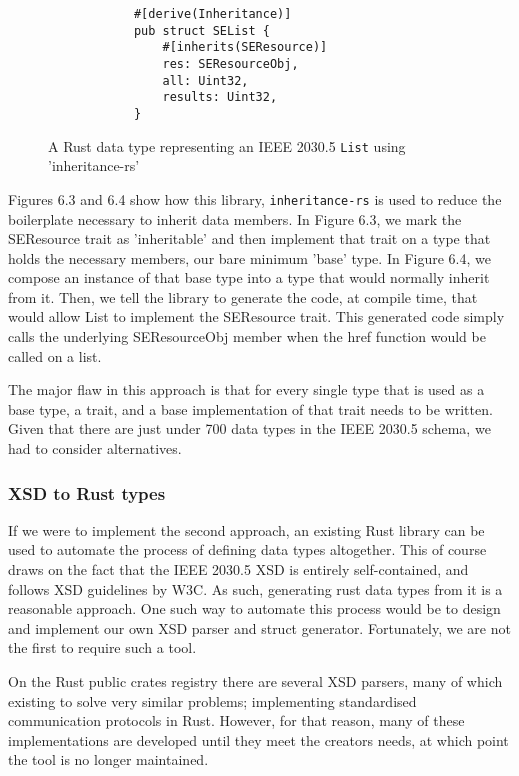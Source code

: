 \begin{figure}[H]
    \begin{center}
        \begin{lstlisting}
            #[derive(Inheritance)]
            pub struct SEList {
                #[inherits(SEResource)]
                res: SEResourceObj,
                all: Uint32,
                results: Uint32,
            }
        \end{lstlisting}
        \label{fig:listinher}
        \caption{A Rust data type representing an IEEE 2030.5 \texttt{List} using 'inheritance-rs'}
    \end{center}
\end{figure}


Figures 6.3 and 6.4 show how this library, \texttt{inheritance-rs} \cite[]{inheritancers} is used to reduce the boilerplate necessary to inherit data members. 
In Figure 6.3, we mark the SEResource trait as 'inheritable' and then implement that trait on a type that holds the necessary members, our bare minimum 'base' type. 
In Figure 6.4, we compose an instance of that base type into a type that would normally inherit from it. Then, we tell the library to generate the code, at compile time, that would allow List to implement the SEResource trait.
This generated code simply calls the underlying SEResourceObj member when the href function would be called on a list.

The major flaw in this approach is that for every single type that is used as a base type, a trait, and a base implementation of that trait needs to be written.
Given that there are just under 700 data types in the IEEE 2030.5 schema, we had to consider alternatives.


\subsubsection{XSD to Rust types}

If we were to implement the second approach, an existing Rust library can be used to automate the process of defining data types altogether.
This of course draws on the fact that the IEEE 2030.5 XSD is entirely self-contained, and follows XSD guidelines by W3C. As such, generating rust data types from it is a reasonable approach.
One such way to automate this process would be to design and implement our own XSD parser and struct generator. Fortunately, we are not the first to require such a tool.

On the Rust public crates registry there are several XSD parsers, many of which existing to solve very similar problems; implementing standardised communication protocols in Rust.
However, for that reason, many of these implementations are developed until they meet the creators needs, at which point the tool is no longer maintained.

